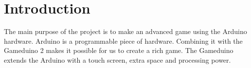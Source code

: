 \chapter{Introduction}
The main purpose of the project is to make an advanced game using the Arduino hardware.
Arduino is a programmable piece of hardware. Combining it with the  Gameduino 2 makes it possible for us to create a rich game. The Gameduino extends the Arduino with a touch screen, extra space and processing power. 


